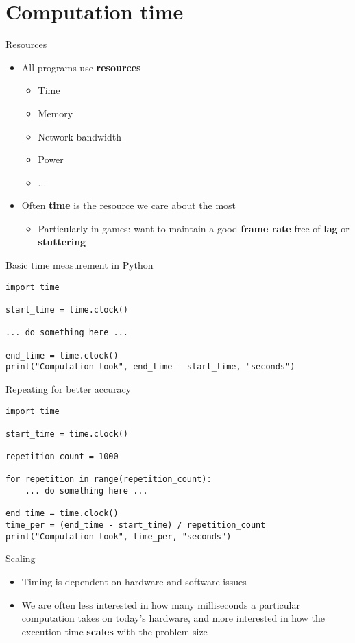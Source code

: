 \part{Computation time}
\frame{\partpage}

\begin{frame}{Resources}
	\begin{itemize}
		\pause\item All programs use \textbf{resources}
			\begin{itemize}
				\pause\item Time
				\pause\item Memory
				\pause\item Network bandwidth
				\pause\item Power
				\pause\item ...
			\end{itemize}
		\pause\item Often \textbf{time} is the resource we care about the most
			\begin{itemize}
				\pause\item Particularly in games:
					want to maintain a good \textbf{frame rate}
					free of \textbf{lag} or \textbf{stuttering}
			\end{itemize}
	\end{itemize}
\end{frame}

\begin{frame}[fragile]{Basic time measurement in Python}
	\begin{lstlisting}
import time

start_time = time.clock()

... do something here ...

end_time = time.clock()
print("Computation took", end_time - start_time, "seconds")
	\end{lstlisting}
\end{frame}

\begin{frame}[fragile]{Repeating for better accuracy}
	\begin{lstlisting}
import time

start_time = time.clock()

repetition_count = 1000

for repetition in range(repetition_count):
    ... do something here ...

end_time = time.clock()
time_per = (end_time - start_time) / repetition_count
print("Computation took", time_per, "seconds")
	\end{lstlisting}
\end{frame}

\begin{frame}{Scaling}
	\begin{itemize}
		\pause\item Timing is dependent on hardware and software issues
		\pause\item We are often less interested in how many milliseconds a particular computation takes on today's hardware, and more interested in how the execution time \textbf{scales} with the problem size
	\end{itemize}
\end{frame}
